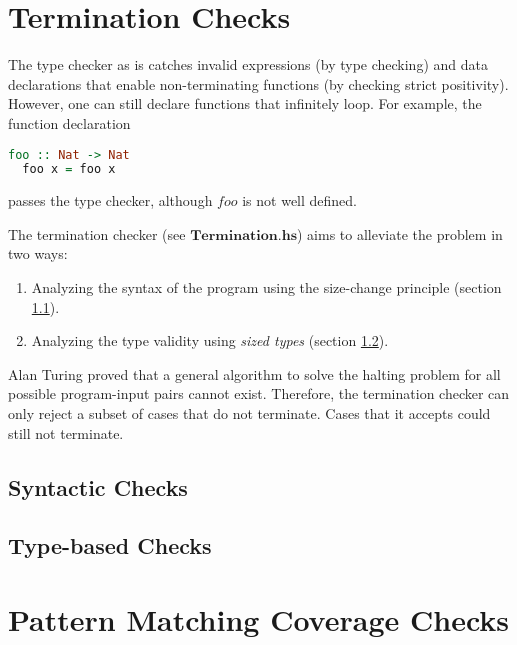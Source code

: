 \documentclass[acmsmall]{acmart}
\numberwithin{figure}{subsection}
\begin{document}
\section{Termination Checks}
\label{sec:termination}

The type checker as is catches invalid expressions (by type checking) and data declarations that enable non-terminating functions (by checking strict positivity). However, one can still declare functions that infinitely loop. For example, the function declaration

\begin{lstlisting}[language=haskell]
  foo :: Nat -> Nat
  foo x = foo x
\end{lstlisting}

passes the type checker, although $foo$ is not well defined.

The termination checker (see $\boldsymbol{Termination.hs}$) aims to alleviate the problem in two ways:

\begin{enumerate}
  \item Analyzing the syntax of the program using the size-change principle (section \ref{sec:synTermination}).
  \item Analyzing the type validity using \emph{sized types} (section \ref{sec:typeTermination}).
\end{enumerate}

Alan Turing proved that a general algorithm to solve the halting problem for all possible program-input pairs cannot exist. Therefore, the termination checker can only reject a subset of cases that do not terminate. Cases that it accepts could still not terminate.

\subsection{Syntactic Checks}
\label{sec:synTermination}



\subsection{Type-based Checks}
\label{sec:typeTermination}

\section{Pattern Matching Coverage Checks}
\label{sec:pattern}


\end{document}
